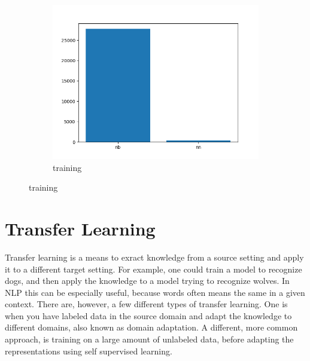 \documentclass{report}
\begin{document}
\begin{figure}[h!]
\begin{subfigure}{.33\textwidth}
		\includegraphics[width=1\linewidth]{img/train_lngs}
		\caption{training}
		\label{fig:trainlngs}
	\end{subfigure}
\end{figure}

\noindent
\section{Transfer Learning}
Transfer learning is a means to exract knowledge from a source setting and apply it to a different target setting. For example, one could train a model to recognize dogs, and then apply the knowledge to a model trying to recognize wolves. In NLP this can be especially useful, because words often means the same in a given context. There are, however, a few different types of transfer learning. One is when you have labeled data in the source domain and adapt the knowledge to different domains, also known as domain adaptation. A different, more common approach, is training on a large amount of unlabeled data, before adapting the representations using self supervised learning.
\end{document}
